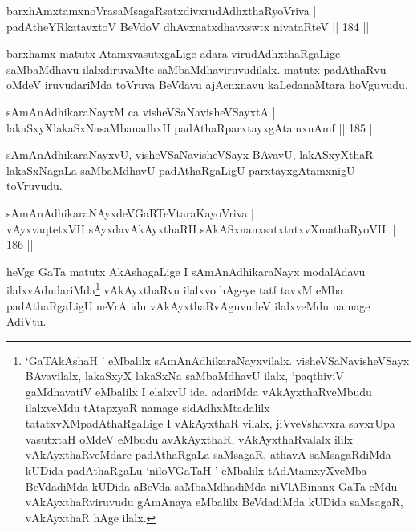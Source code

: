 \begin{shl}
barxhAmxtamxnoVrasaMsagaRsatxdivxrudAdhxthaRyoVriva |\\
padAtheYRkatavxtoV BeVdoV dhAvxnatxdhavxswtx nivataRteV \hfill || 184 ||
\end{shl}

\begin{artha}
barxhamx matutx AtamxvasutxgaLige adara virudAdhxthaRgaLige saMbaMdhavu ilalxdiruvaMte saMbaMdhaviruvudilalx. matutx padAthaRvu oMdeV iruvudariMda toVruva BeVdavu ajAcnxnavu kaLedanaMtara hoVguvudu.
\end{artha}


\begin{shl}
sAmAnAdhikaraNayxM ca visheVSaNavisheVSayxtA |\\
lakaSxyXlakaSxNasaMbanadhxH padAthaRparxtayxgAtamxnAmf \hfill || 185 ||
\end{shl}

\begin{artha}
sAmAnAdhikaraNayxvU, visheVSaNavisheVSayx BAvavU, lakASxyXthaR lakaSxNagaLa saMbaMdhavU padAthaRgaLigU parxtayxgAtamxnigU toVruvudu.
\end{artha}


\begin{shl}
sAmAnAdhikaraNAyxdeVGaRTeVtaraKayoVriva |\\
vAyxvaqtetxVH sAyxdavAkAyxthaRH sAkASxnanxsatxtatxvXmathaRyoVH \hfill || 186 ||
\end{shl}

\begin{artha}
heVge GaTa matutx AkAshagaLige I sAmAnAdhikaraNayx modalAdavu ilalxvAdudariMda\footnote{`GaTAkAshaH ' eMbalilx sAmAnAdhikaraNayxvilalx. visheVSaNavisheVSayx BAvavilalx, lakaSxyX lakaSxNa saMbaMdhavU ilalx, `paqthiviV gaMdhavatiV eMbalilx I elalxvU ide. adariMda vAkAyxthaRveMbudu ilalxveMdu tAtapxyaR namage sidAdhxMtadalilx tatatxvXMpadAthaRgaLige I vAkAyxthaR vilalx, jiVveVshavxra savxrUpa vasutxtaH oMdeV eMbudu avAkAyxthaR, vAkAyxthaRvalalx ililx vAkAyxthaRveMdare padAthaRgaLa saMsagaR, athavA saMsagaRdiMda kUDida padAthaRgaLu `niloVGaTaH ' eMbalilx tAdAtamxyXveMba BeVdadiMda kUDida aBeVda saMbaMdhadiMda niVlABinanx GaTa eMdu vAkAyxthaRviruvudu gAmAnaya eMbalilx BeVdadiMda kUDida saMsagaR, vAkAyxthaR hAge ilalx.} vAkAyxthaRvu ilalxvo hAgeye tatf tavxM eMba padAthaRgaLigU neVrA idu vAkAyxthaRvAguvudeV ilalxveMdu namage AdiVtu.
\end{artha}


